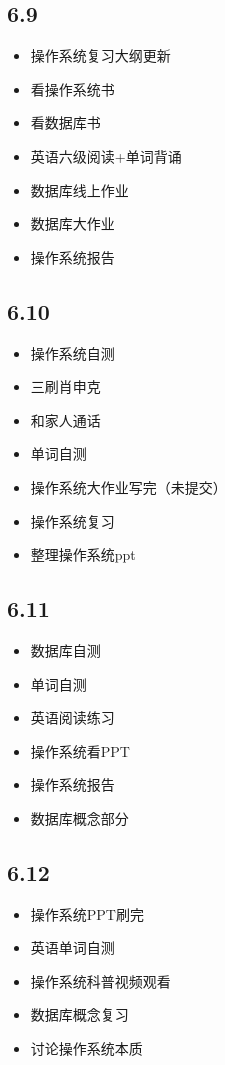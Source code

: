 \documentclass[UTF8]{ctexart}
\begin{document}
\subsection*{6.9}
\begin{itemize}
    \item 操作系统复习大纲更新
    \item 看操作系统书
    \item 看数据库书
    \item 英语六级阅读+单词背诵
    \item 数据库线上作业
    \item 数据库大作业
    \item 操作系统报告
\end{itemize}
\subsection*{6.10}
\begin{itemize}
    \item 操作系统自测
    \item 三刷肖申克
    \item 和家人通话
    \item 单词自测
    \item 操作系统大作业写完（未提交）
    \item 操作系统复习
    \item 整理操作系统ppt
\end{itemize}
\subsection*{6.11}
\begin{itemize}
    \item 数据库自测
    \item 单词自测
    \item 英语阅读练习
    \item 操作系统看PPT
    \item 操作系统报告
    \item 数据库概念部分
\end{itemize}
\subsection*{6.12}
\begin{itemize}
    \item 操作系统PPT刷完
    \item 英语单词自测
    \item 操作系统科普视频观看
    \item 数据库概念复习
    \item 讨论操作系统本质
\end{itemize}
\end{document}
